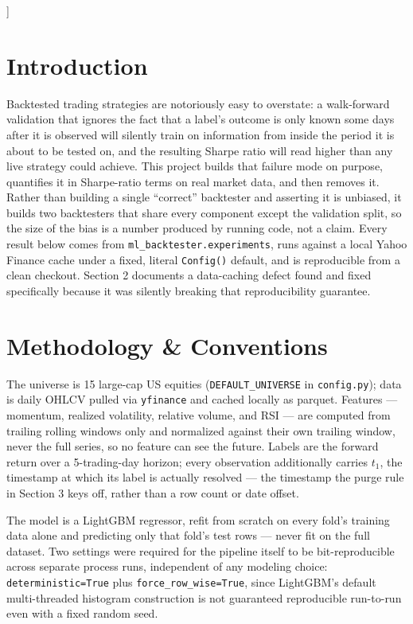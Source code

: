 \documentclass[10pt]{article}
\begin{document}
\vspace{1em}
]

\section{Introduction}

Backtested trading strategies are notoriously easy to overstate: a walk-forward validation that ignores the fact that a label's outcome is only known some days after it is observed will silently train on information from inside the period it is about to be tested on, and the resulting Sharpe ratio will read higher than any live strategy could achieve. This project builds that failure mode on purpose, quantifies it in Sharpe-ratio terms on real market data, and then removes it. Rather than building a single ``correct'' backtester and asserting it is unbiased, it builds two backtesters that share every component except the validation split, so the size of the bias is a number produced by running code, not a claim. Every result below comes from \texttt{ml\_backtester.experiments}, runs against a local Yahoo Finance cache under a fixed, literal \texttt{Config()} default, and is reproducible from a clean checkout. Section 2 documents a data-caching defect found and fixed specifically because it was silently breaking that reproducibility guarantee.

\section{Methodology \& Conventions}

The universe is 15 large-cap US equities (\texttt{DEFAULT\_UNIVERSE} in \texttt{config.py}); data is daily OHLCV pulled via \texttt{yfinance} and cached locally as parquet. Features --- momentum, realized volatility, relative volume, and RSI --- are computed from trailing rolling windows only and normalized against their own trailing window, never the full series, so no feature can see the future. Labels are the forward return over a 5-trading-day horizon; every observation additionally carries $t_1$, the timestamp at which its label is actually resolved --- the timestamp the purge rule in Section 3 keys off, rather than a row count or date offset.

The model is a LightGBM regressor, refit from scratch on every fold's training data alone and predicting only that fold's test rows --- never fit on the full dataset. Two settings were required for the pipeline itself to be bit-reproducible across separate process runs, independent of any modeling choice: \texttt{deterministic=True} plus \texttt{force\_row\_wise=True}, since LightGBM's default multi-threaded histogram construction is not guaranteed reproducible run-to-run even with a fixed random seed.
\end{document}
